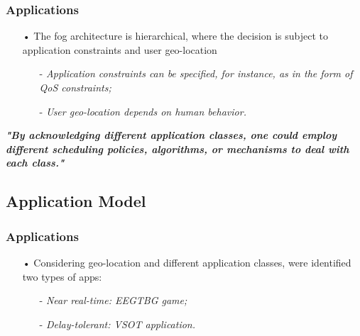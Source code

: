 \documentclass[10pt, pdf, xcolor=pdftex, dvipsnames, table]{beamer}
\begin{document}
\begin{frame}
	\tableofcontents[currentsection]
\end{frame}

\begin{frame}
	\frametitle{Applications}
 	\begin{block}{}
 		\begin{itemize}
 		    \item[•] The fog architecture is hierarchical, where the decision is subject to application constraints and user geo-location\newline
 				\begin{itemize}
 		    		\item[-] \footnotesize\textit{Application constraints can be specified, for instance, as in the form of QoS constraints;}\newline
 		    		\item[-] \footnotesize\textit{User geo-location depends on human behavior.}
 		    	\end{itemize}
 		\end{itemize}
 	\end{block}
 	\footnotesize\textit{\textbf{"By acknowledging different application classes, one could employ different scheduling policies, algorithms, or mechanisms to deal with each class."}}
\end{frame}

\subsection[Application Model]{Application Model}

\begin{frame}
	\frametitle{Applications}
 	\begin{block}{}
 		\begin{itemize}
 		    \item[•] Considering geo-location and different application classes, were identified two types of apps:\newline
 				\begin{itemize}
 		    		\item[-] \footnotesize\textit{Near real-time: EEGTBG game;}\newline
 		    		\item[-] \footnotesize\textit{Delay-tolerant: VSOT application.}
 		    	\end{itemize}
 		\end{itemize}
 	\end{block}
\end{frame}
\end{document}
